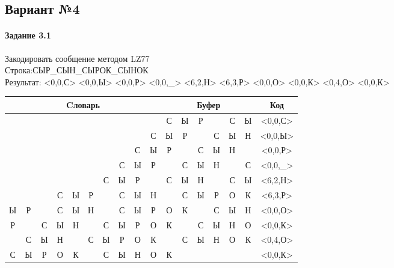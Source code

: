 \documentclass[a4paper, 12pt]{article}
\begin{document}
\pagebreak
\subsection{Вариант №4}
\paragraph{Задание 3.1}

Закодировать сообщение методом LZ77\\
Строка:СЫР\_СЫН\_СЫРОК\_СЫНОК\\
Результат: <0,0,С> <0,0,Ы> <0,0,Р> <0,0,\_> <6,2,Н> <6,3,Р> <0,0,О> <0,0,К> <0,4,О> <0,0,К>\\
\begin{table}[h!]
\centering
\begin{tabular}{|c|c|c|c|c|c|c|c|c|c|c|c|c|c|c|c|c|} 
\hline
\multicolumn{10}{|c|}{Cловарь} & \multicolumn{6}{c|}{Буфер} & Код  \\ \hline
  &   &   &   &   &   &   &   &   &   & \cellcolor[HTML]{8CE4F6} С & Ы & Р &   & С & Ы & <0,0,С>
\\ \hline
  &   &   &   &   &   &   &   &   & С & \cellcolor[HTML]{8CE4F6} Ы & Р &   & С & Ы & Н & <0,0,Ы>
\\ \hline
  &   &   &   &   &   &   &   & С & Ы & \cellcolor[HTML]{8CE4F6} Р &   & С & Ы & Н &   & <0,0,Р>
\\ \hline
  &   &   &   &   &   &   & С & Ы & Р & \cellcolor[HTML]{8CE4F6}   & С & Ы & Н &   & С & <0,0,\_>
\\ \hline
  &   &   &   &   &   & \cellcolor[HTML]{FFFF00} С & \cellcolor[HTML]{FFFF00} Ы & Р &   & \cellcolor[HTML]{FFFF00} С & \cellcolor[HTML]{FFFF00} Ы & \cellcolor[HTML]{8CE4F6} Н &   & С & Ы & <6,2,Н>
\\ \hline
  &   &   & С & Ы & Р & \cellcolor[HTML]{FFFF00}   & \cellcolor[HTML]{FFFF00} С & \cellcolor[HTML]{FFFF00} Ы & Н & \cellcolor[HTML]{FFFF00}   & \cellcolor[HTML]{FFFF00} С & \cellcolor[HTML]{FFFF00} Ы & \cellcolor[HTML]{8CE4F6} Р & О & К & <6,3,Р>
\\ \hline
Ы & Р &   & С & Ы & Н &   & С & Ы & Р & \cellcolor[HTML]{8CE4F6} О & К &   & С & Ы & Н & <0,0,О>
\\ \hline
Р &   & С & Ы & Н &   & С & Ы & Р & О & \cellcolor[HTML]{8CE4F6} К &   & С & Ы & Н & О & <0,0,К>
\\ \hline
\cellcolor[HTML]{FFFF00}   & \cellcolor[HTML]{FFFF00} С & \cellcolor[HTML]{FFFF00} Ы & \cellcolor[HTML]{FFFF00} Н &   & С & Ы & Р & О & К & \cellcolor[HTML]{FFFF00}   & \cellcolor[HTML]{FFFF00} С & \cellcolor[HTML]{FFFF00} Ы & \cellcolor[HTML]{FFFF00} Н & \cellcolor[HTML]{8CE4F6} О & К & <0,4,О>
\\ \hline
С & Ы & Р & О & К &   & С & Ы & Н & О & \cellcolor[HTML]{8CE4F6} К &   &   &   &   &   & <0,0,К>
\\ \hline
\end{tabular}
\end{table}
\end{document}
